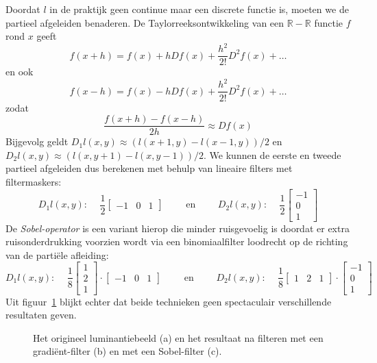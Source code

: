 Doordat $l$ in de praktijk geen continue maar een discrete functie is, moeten we de partieel afgeleiden benaderen.
De Taylorreeksontwikkeling van een $\mathbb{R} - \mathbb{R}$ functie $f$ rond $x$ geeft
$$
f(x+h) = f(x) + h D f(x) + \frac{h^2}{2!} D^2 f(x) + \ldots
$$
en ook
$$
f(x-h) = f(x) - h D f(x) + \frac{h^2}{2!} D^2 f(x) + \ldots
$$
zodat
$$
\frac{f(x+h) - f(x-h)}{2h} \approx D f(x)
$$
Bijgevolg geldt $D_1 l(x,y) \approx (l(x+1,y) - l(x-1,y))/2$ en $D_2 l(x,y) \approx (l(x,y+1) - l(x,y-1))/2$. We
kunnen de eerste en tweede partieel afgeleiden dus berekenen met behulp van lineaire filters met filtermaskers:
$$
D_1 l(x,y)\textrm{: }\quad \frac{1}{2} \left[ \begin{array}{ccc} -1 & 0 & 1 \end{array} \right] \qquad \textrm{ en } 
\qquad D_2 l(x,y)\textrm{: }\quad \frac{1}{2} \left[ \begin{array}{c} -1 \\ 0 \\ 1 \end{array} \right]
$$
De \emph{Sobel-operator} is een variant hierop die minder ruisgevoelig is doordat er 
extra ruisonderdrukking voorzien wordt via een binomiaalfilter loodrecht op de richting 
van de parti\"ele afleiding:
$$
D_1 l(x,y)\textrm{: }\quad \frac{1}{8} \left[ \begin{array}{c} 1 \\ 2 \\ 1 \end{array} \right] \cdot \left[ \begin{array}{ccc} -1 & 0 & 1 \end{array} \right] \qquad \textrm{ en } 
\qquad D_2 l(x,y)\textrm{: }\quad \frac{1}{8} \left[ \begin{array}{ccc} 1 & 2 & 1 \end{array} \right] \cdot \left[ \begin{array}{c} -1 \\ 0 \\ 1 \end{array} \right]
$$
Uit figuur~\ref{fig:randdetectie} blijkt echter dat beide technieken geen spectaculair verschillende 
resultaten geven.

\begin{figure}[tbp]
\begin{center}
\caption{\label{fig:randdetectie}Het origineel luminantiebeeld (a) en het resultaat na filteren met een gradi\"ent-filter (b) en met een Sobel-filter (c).}
\end{center}
\end{figure}
